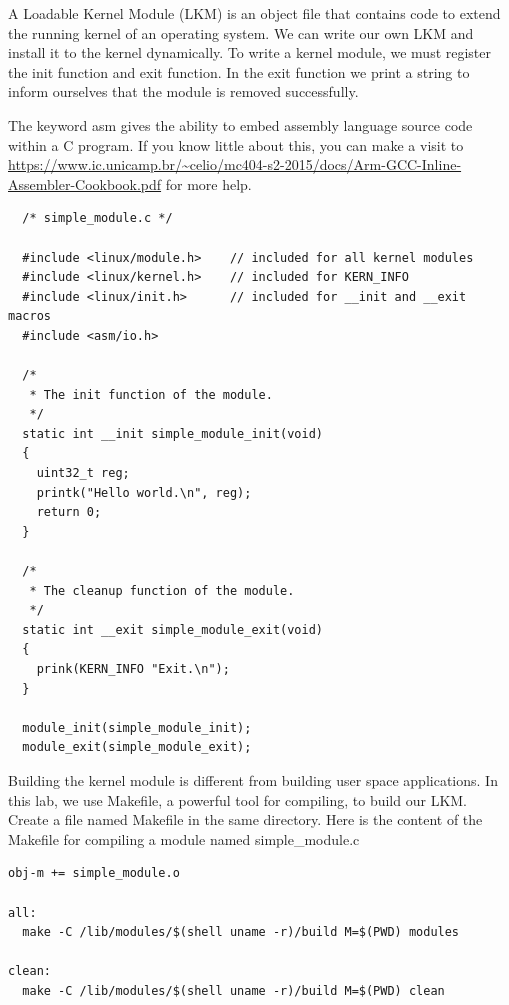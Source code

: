 A Loadable Kernel Module (LKM) is an object file that contains code to extend
the running kernel of an operating system. We can write our own LKM and install
it to the kernel dynamically. To write a kernel module, we must register the
init function and exit function. 
In the exit function we print a string to inform ourselves that the module is removed successfully.

The keyword asm gives the ability to embed assembly language source code within a C program. If you know little about this, you can make a visit to \url{https://www.ic.unicamp.br/~celio/mc404-s2-2015/docs/Arm-GCC-Inline-Assembler-Cookbook.pdf} for more help.


\begin{lstlisting}
  /* simple_module.c */
  
  #include <linux/module.h>    // included for all kernel modules
  #include <linux/kernel.h>    // included for KERN_INFO
  #include <linux/init.h>      // included for __init and __exit macros
  #include <asm/io.h>
  
  /*
   * The init function of the module.
   */
  static int __init simple_module_init(void)
  {
    uint32_t reg;
    printk("Hello world.\n", reg);
    return 0;
  }
  
  /*
   * The cleanup function of the module.
   */
  static int __exit simple_module_exit(void)
  {
    prink(KERN_INFO "Exit.\n");
  }
  
  module_init(simple_module_init);
  module_exit(simple_module_exit);

\end{lstlisting}

Building the kernel module is different from building user space applications. In this lab, we use Makefile, a powerful tool for compiling, to build our LKM. Create a file named Makefile in the same directory. Here is the content of the Makefile for compiling a module named simple\_module.c

\begin{lstlisting}
obj-m += simple_module.o

all:
  make -C /lib/modules/$(shell uname -r)/build M=$(PWD) modules

clean:
  make -C /lib/modules/$(shell uname -r)/build M=$(PWD) clean
\end{lstlisting}

